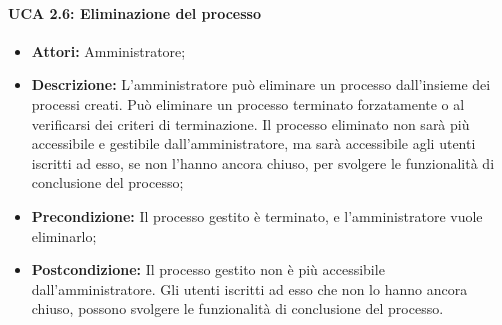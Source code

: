 \paragraph{UCA 2.6: Eliminazione del processo}
\begin{itemize}
\item \textbf{Attori:} Amministratore;
\item \textbf{Descrizione:} 
L'amministratore può eliminare un processo dall'insieme dei processi creati.
Può eliminare un processo terminato forzatamente o al verificarsi dei criteri di terminazione.
Il processo eliminato non sarà più accessibile e gestibile dall'amministratore, ma sarà accessibile agli utenti iscritti ad esso, se non l'hanno ancora chiuso, per svolgere le funzionalità di conclusione del processo;
\item \textbf{Precondizione:} 
Il processo gestito è terminato, e l'amministratore vuole eliminarlo;
\item \textbf{Postcondizione:} 
Il processo gestito non è più accessibile dall'amministratore. Gli utenti iscritti ad esso che non lo hanno ancora chiuso, possono svolgere le funzionalità di conclusione del processo.
\end{itemize}
